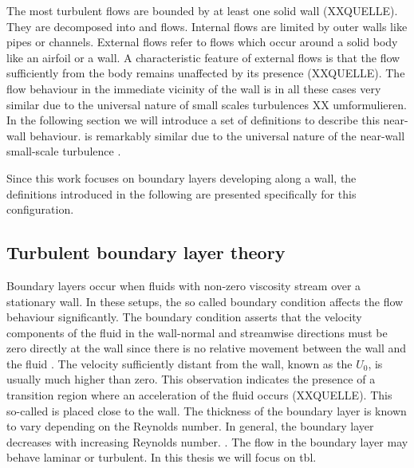The most turbulent flows are bounded by at least one solid wall (XXQUELLE).
They are decomposed into  and  flows. 
Internal flows are limited by outer walls like pipes or channels.
External flows refer to flows which occur around a solid body like an airfoil or a wall.
A characteristic feature of external flows is that the flow sufficiently from the body remains unaffected by its presence (XXQUELLE).
The flow behaviour in the immediate vicinity of the wall is in all these cases very similar due to the universal nature of small scales turbulences \citep{pope_turbulent_2015}XX umformulieren.
In the following section we will introduce a set of definitions to describe this near-wall behaviour.
is remarkably similar due to the universal nature of the near-wall small-scale turbulence \citep{pope_turbulent_2015}. 

Since this work focuses on boundary layers developing along a wall, the definitions introduced in the following are presented specifically for this configuration.

\subsection{Turbulent boundary layer theory} \label{subsec:TBLTheory}

Boundary layers occur when fluids with non-zero viscosity stream over a stationary wall. 
In these setups, the so called  boundary condition affects the flow behaviour significantly.
The  boundary condition  asserts that the velocity components of the fluid in the wall-normal and streamwise directions must be zero directly at the wall since there is no relative movement between the wall and the fluid \citep{schlichting_boundary-layer_2017}. 
The velocity sufficiently distant from the wall, known as the  $U_0$, is usually much higher than zero. This observation indicates the presence of   a transition region where an acceleration of the fluid occurs (XXQUELLE).
This so-called  is placed close to the wall. 
The thickness of the boundary layer is known to vary depending on the Reynolds number. In general, the boundary layer decreases with increasing Reynolds number. \cite{schlichting_boundary-layer_2017}. 
The flow in the boundary layer may behave laminar or turbulent. In this thesis we will focus on \acrfull{tbl}.

